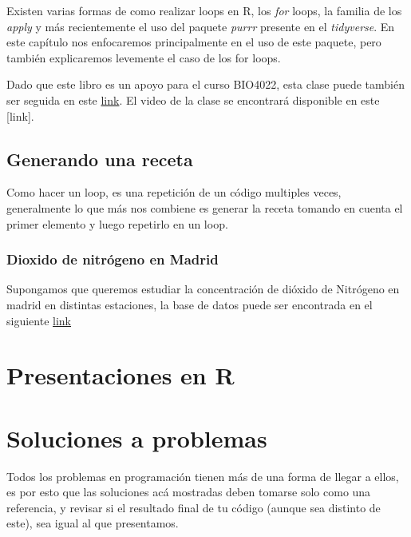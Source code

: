 \documentclass[]{book}
\begin{document}
Existen varias formas de como realizar loops en R, los \emph{for} loops,
la familia de los \emph{apply} y más recientemente el uso del paquete
\emph{purrr} \citep{HenryPurrr} presente en el \emph{tidyverse}. En este
capítulo nos enfocaremos principalmente en el uso de este paquete, pero
también explicaremos levemente el caso de los for loops.

Dado que este libro es un apoyo para el curso BIO4022, esta clase puede
también ser seguida en este
\href{https://derek-corcoran-barrios.github.io/Clase6/Clase6Loopsybibliografia}{link}.
El video de la clase se encontrará disponible en este {[}link{]}.

\hypertarget{generando-una-receta}{%
\section{Generando una receta}\label{generando-una-receta}}

Como hacer un loop, es una repetición de un código multiples veces,
generalmente lo que más nos combiene es generar la receta tomando en
cuenta el primer elemento y luego repetirlo en un loop.

\hypertarget{dioxido-de-nitrogeno-en-madrid}{%
\subsection{Dioxido de nitrógeno en
Madrid}\label{dioxido-de-nitrogeno-en-madrid}}

Supongamos que queremos estudiar la concentración de dióxido de
Nitrógeno en madrid en distintas estaciones, la base de datos puede ser
encontrada en el siguiente
\href{https://www.kaggle.com/decide-soluciones/air-quality-madrid}{link}

\hypertarget{presentacion}{%
\chapter{Presentaciones en R}\label{presentacion}}

\hypertarget{soluciones}{%
\chapter{Soluciones a problemas}\label{soluciones}}

Todos los problemas en programación tienen más de una forma de llegar a
ellos, es por esto que las soluciones acá mostradas deben tomarse solo
como una referencia, y revisar si el resultado final de tu código
(aunque sea distinto de este), sea igual al que presentamos.
\end{document}
